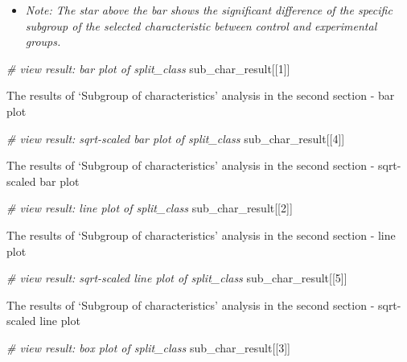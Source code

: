 \documentclass[]{article}
\providecommand{\tightlist}{%
  \setlength{\itemsep}{0pt}\setlength{\parskip}{0pt}}
\newcommand{\hlnum}[1]{\textcolor[rgb]{0.816,0.125,0.439}{#1}}%
\newcommand{\hlcom}[1]{\textcolor[rgb]{0.502,0.502,0.502}{\textit{#1}}}%
\newcommand{\hlstd}[1]{\textcolor[rgb]{0.251,0.251,0.251}{#1}}%
\newenvironment{Shaded}{\begin{myshaded}}{\end{myshaded}}
\newcommand{\DecValTok}[1]{\hlnum{#1}}
\newcommand{\CommentTok}[1]{\hlcom{#1}}
\newcommand{\NormalTok}[1]{\hlstd{#1}}
\begin{document}
\begin{itemize}
\tightlist
\item
  \emph{Note: The star above the bar shows the significant difference of the specific subgroup of the selected characteristic between control and experimental groups.}
\end{itemize}

\begin{Shaded}
\begin{Highlighting}[]
\CommentTok{# view result: bar plot of split_class}
\NormalTok{sub_char_result[[}\DecValTok{1}\NormalTok{]]  }
\end{Highlighting}
\end{Shaded}

\label{fig:unnamed-chunk-41}The results of `Subgroup of characteristics' analysis in the second section - bar plot

\begin{Shaded}
\begin{Highlighting}[]
\CommentTok{# view result: sqrt-scaled bar plot of split_class}
\NormalTok{sub_char_result[[}\DecValTok{4}\NormalTok{]]}
\end{Highlighting}
\end{Shaded}

\label{fig:unnamed-chunk-42}The results of `Subgroup of characteristics' analysis in the second section - sqrt-scaled bar plot

\begin{Shaded}
\begin{Highlighting}[]
\CommentTok{# view result: line plot of split_class}
\NormalTok{sub_char_result[[}\DecValTok{2}\NormalTok{]]}
\end{Highlighting}
\end{Shaded}

\label{fig:unnamed-chunk-43}The results of `Subgroup of characteristics' analysis in the second section - line plot

\begin{Shaded}
\begin{Highlighting}[]
\CommentTok{# view result: sqrt-scaled line plot of split_class}
\NormalTok{sub_char_result[[}\DecValTok{5}\NormalTok{]] }
\end{Highlighting}
\end{Shaded}

\label{fig:unnamed-chunk-44}The results of `Subgroup of characteristics' analysis in the second section - sqrt-scaled line plot

\begin{Shaded}
\begin{Highlighting}[]
\CommentTok{# view result: box plot of split_class}
\NormalTok{sub_char_result[[}\DecValTok{3}\NormalTok{]] }
\end{Highlighting}
\end{Shaded}
\end{document}
